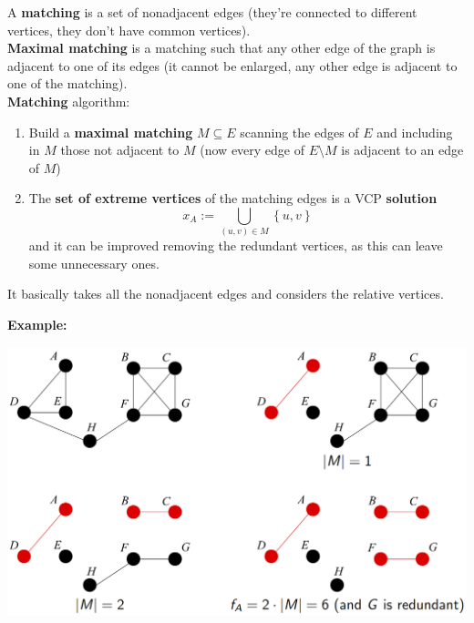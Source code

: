 \documentclass[11pt]{article}
\begin{document}
	A \textbf{matching} is a set of nonadjacent edges (they're connected to different vertices, they don't have common vertices).\\
	\textbf{Maximal matching} is a matching such that any other edge of the graph is adjacent to one of its edges (it cannot be enlarged, any other edge is adjacent to one of the matching).\\
	
	\textbf{Matching} algorithm:
	\begin{enumerate}
		\item Build a \textbf{maximal matching} $M \subseteq E$ scanning the edges of $E$ and including in $M$ those not adjacent to $M$ (now every edge of $E \setminus M$ is adjacent to an edge of $M$)
		\item The \textbf{set of extreme vertices} of the matching edges is a VCP \textbf{solution}
		$$ x_A := \bigcup_{(u,v) \in M} \left\{u,v\right\}$$
		and it can be improved removing the redundant vertices, as this can leave some unnecessary ones.
	\end{enumerate}
	It basically takes all the nonadjacent edges and considers the relative vertices.\\
	
	\newpage
	
	\textbf{Example:}
	\begin{center}
		\includegraphics[width=\columnwidth]{img/VCP2Approx}
	\end{center}
	
\end{document}
